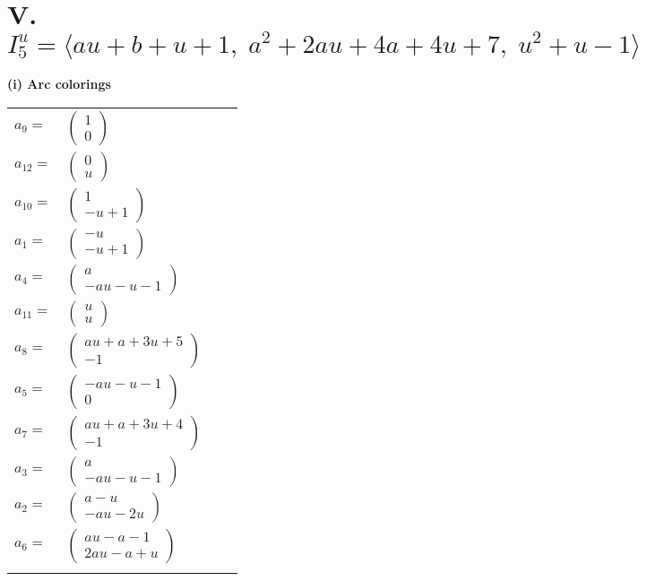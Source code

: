 \documentclass[1p]{elsarticle_modified}
\theoremstyle{definition}
\begin{document}
\centering \section*{V. $I^u_{5}= \langle a u+b+u+1,\;a^2+2 a u+4 a+4 u+7,\;u^2+u-1 \rangle$}
\flushleft \textbf{(i) Arc colorings}\\
\begin{tabular}{m{7pt} m{180pt} m{7pt} m{180pt} }
\flushright $a_{9}=$&$\begin{pmatrix}1\\0\end{pmatrix}$ \\
\flushright $a_{12}=$&$\begin{pmatrix}0\\u\end{pmatrix}$ \\
\flushright $a_{10}=$&$\begin{pmatrix}1\\- u+1\end{pmatrix}$ \\
\flushright $a_{1}=$&$\begin{pmatrix}- u\\- u+1\end{pmatrix}$ \\
\flushright $a_{4}=$&$\begin{pmatrix}a\\- a u- u-1\end{pmatrix}$ \\
\flushright $a_{11}=$&$\begin{pmatrix}u\\u\end{pmatrix}$ \\
\flushright $a_{8}=$&$\begin{pmatrix}a u+a+3 u+5\\-1\end{pmatrix}$ \\
\flushright $a_{5}=$&$\begin{pmatrix}- a u- u-1\\0\end{pmatrix}$ \\
\flushright $a_{7}=$&$\begin{pmatrix}a u+a+3 u+4\\-1\end{pmatrix}$ \\
\flushright $a_{3}=$&$\begin{pmatrix}a\\- a u- u-1\end{pmatrix}$ \\
\flushright $a_{2}=$&$\begin{pmatrix}a- u\\- a u-2 u\end{pmatrix}$ \\
\flushright $a_{6}=$&$\begin{pmatrix}a u- a-1\\2 a u- a+u\end{pmatrix}$\\&\end{tabular}
\end{document}
